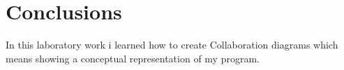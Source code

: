\section*{Conclusions}
In this laboratory work i learned how to create Collaboration diagrams which means showing a conceptual representation of my program.
\clearpage